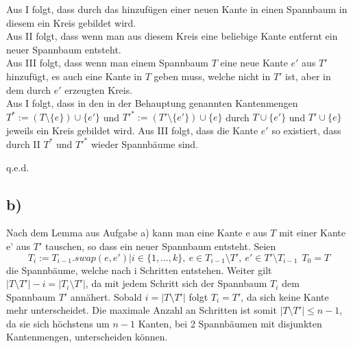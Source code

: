 \documentclass[a4paper,11pt,twoside]{scrartcl}
\begin{document}
Aus I folgt, dass durch das hinzufügen einer neuen Kante in einen Spannbaum in diesem ein Kreis gebildet wird.\\
Aus II folgt, dass wenn man aus diesem Kreis eine beliebige Kante entfernt ein neuer  Spannbaum entsteht.\\
Aus III folgt, dass wenn man einem Spannbaum $T$ eine neue Kante $e'$ aus $T'$ hinzufügt, es auch eine Kante in $T$ geben muss, welche nicht in $T'$ ist, aber in dem durch $e'$ erzeugten Kreis.\\

Aus I folgt, dass in den in der Behauptung genannten Kantenmengen $T^*:=(T\setminus\{e\})\cup\{e'\}$ und $T'^*:= (T'\setminus\{e'\})\cup\{e\}$ 
durch $T\cup \{e'\}$ und $T' \cup \{e\}$ jeweils ein Kreis gebildet wird.
Aus III folgt, dass die Kante $e'$ so existiert, dass durch II $T^*$ und $T'^*$ wieder Spannbäume sind.
\begin{flushright}
	q.e.d.
\end{flushright}

\subsection*{b)}
Nach dem Lemma aus Aufgabe a) kann man eine Kante e aus $T$ mit einer Kante e' aus $T'$ tauschen, so dass ein neuer Spannbaum entsteht. Seien 
\[T_i:= T_{i-1}.swap(e,e') | i\in\{1,\ldots,k\},~e\in T_{i-1}\setminus T',~ e'\in T'\setminus T_{i-1}~~T_0=T\]
 die Spannbäume, welche nach i Schritten entstehen. Weiter gilt $|T\setminus T'| - i = |T_i\setminus T'|$, da mit jedem Schritt sich der Spannbaum $T_i$ dem Spannbaum $T'$ annähert. Sobald $i = |T\setminus T'|$ folgt $T_i = T'$, da sich keine Kante mehr unterscheidet. Die maximale Anzahl an Schritten ist somit $|T\setminus T'| \leq n-1$, da sie sich höchstens um $n-1$ Kanten, bei 2 Spannbäumen mit disjunkten Kantenmengen, unterscheiden können.
\end{document}
